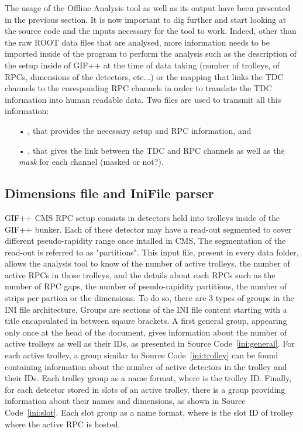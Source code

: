 	The usage of the Offline Analysis tool as well as its output have been presented in the previous section. It is now important to dig further and start looking at the source code and the inputs necessary for the tool to work. Indeed, other than the raw ROOT data files that are analysed, more information needs to be imported inside of the program to perform the analysis such as the description of the setup inside of GIF++ at the time of data taking (number of trolleys, of RPCs, dimensions of the detectors, etc...) or the mapping that links the TDC channels to the coresponding RPC channels in order to translate the TDC information into human readable data. Two files are used to transmit all this information:\\
	
	\begin{itemize}
		\item[•] , that provides the necessary setup and RPC information, and
		\item[•] , that gives the link between the TDC and RPC channels as well as the \textit{mask} for each channel (masked or not?).
	\end{itemize}
	
	\subsection{Dimensions file and IniFile parser}
	\label{app2:ssec:dimensions}
	
	GIF++ CMS RPC setup consists in detectors held into trolleys inside of the GIF++ bunker. Each of these detector may have a read-out segmented to cover different pseudo-rapidity range once intalled in CMS. The segmentation of the read-out is referred to as "partitions". This input file, present in every data folder, allows the analysis tool to know of the number of active trolleys, the number of active RPCs in those trolleys, and the details about each RPCs such as the number of RPC gaps, the number of pseudo-rapidity partitions, the number of strips per partion or the dimensions. To do so, there are 3 types of groups in the INI file architecture. Groups are sections of the INI file content starting with a title encapsulated in between sqaure brackets. A first general group, appearing only once at the head of the document, gives information about the number of active trolleys as well as their IDs, as presented in Source Code~\ref{ini:general}. For each active trolley, a group similar to Source Code~\ref{ini:trolley} can be found containing information about the number of active detectors in the trolley and their IDs. Each trolley group as a  name format, where  is the trolley ID. Finally, for each detector stored in slots of an active trolley, there is a group providing information about their names and dimensions, as shown in Source Code~\ref{ini:slot}. Each slot group as a  name format, where  is the slot ID of trolley  where the active RPC is hosted.\\
	
